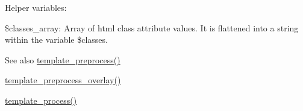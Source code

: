 Helper variables:
\begin{DoxyItemize}
\item \$classes\_\-array: Array of html class attribute values. It is flattened into a string within the variable \$classes.
\end{DoxyItemize}

\begin{DoxySeeAlso}{See also}
\hyperlink{includes_2theme_8inc_a3eeb7bcdba7ef4859f99586da264d347}{template\_\-preprocess()} 

\hyperlink{overlay_8module_a490f0cf3842ad8381b483be8ec42a153}{template\_\-preprocess\_\-overlay()} 

\hyperlink{includes_2theme_8inc_a9b4d56c55dab2c59b7af6f71d6b1a940}{template\_\-process()} 
\end{DoxySeeAlso}
